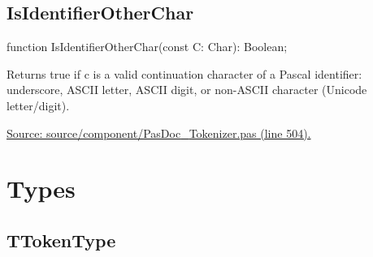 \documentclass{report}
\newif\ifpdf
\begin{document}
\subsection*{IsIdentifierOtherChar}
\fi
\label{PasDoc_Tokenizer-IsIdentifierOtherChar}
\begin{list}{}{
\setlength{\itemindent}{0cm}
\setlength{\listparindent}{0cm}
\setlength{\leftmargin}{\evensidemargin}
\addtolength{\leftmargin}{\tmplength}
\settowidth{\labelsep}{X}
\addtolength{\leftmargin}{\labelsep}
\setlength{\labelwidth}{\tmplength}
}
\item[\textbf{Declaration}\hfill]
\ifpdf
\begin{flushleft}
\fi
\begin{ttfamily}
function IsIdentifierOtherChar(const C: Char): Boolean;\end{ttfamily}

\ifpdf
\end{flushleft}
\fi

\par
\item[\textbf{Description}]
Returns true if c is a valid continuation character of a Pascal identifier: underscore, ASCII letter, ASCII digit, or non{-}ASCII character (Unicode letter/digit).\par
\href{https://github.com/pasdoc/pasdoc/blob/master/source/component/PasDoc_Tokenizer.pas#L504}{Source: source/component/PasDoc{\_}Tokenizer.pas (line 504).}

\end{list}
\section{Types}
\ifpdf
\subsection*{\large{\textbf{TTokenType}}\normalsize\hspace{1ex}\hrulefill}
\else
\end{document}

